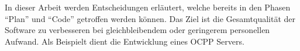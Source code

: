 
In dieser Arbeit werden Entscheidungen erläutert, 
welche bereits in den Phasen ``Plan'' und ``Code'' getroffen werden können.
Das Ziel ist die Gesamtqualität der Software zu verbesseren bei 
gleichbleibendem oder geringerem personellen Aufwand. Als Beispielt dient die Entwicklung eines OCPP Servers.